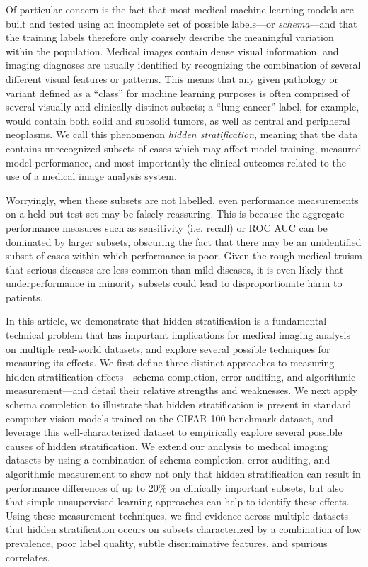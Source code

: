 \documentclass[sigconf]{acmart}
\begin{document}
Of particular concern is the fact that most medical machine learning models are built and tested using an incomplete set of possible labels---or \textit{schema}---and that the training labels therefore only coarsely describe the meaningful variation within the population. 
Medical images contain dense visual information, and imaging diagnoses are usually identified by recognizing the combination of several different visual features or patterns. 
This means that any given pathology or variant defined as a ``class'' for machine learning purposes is often comprised of several visually and clinically distinct subsets; a ``lung cancer'' label, for example, would contain both solid and subsolid tumors, as well as central and peripheral neoplasms. 
We call this phenomenon \textit{hidden stratification}, meaning that the data contains unrecognized subsets of cases which may affect model training, measured model performance, and most importantly the clinical outcomes related to the use of a medical image analysis system.  

Worryingly, when these subsets are not labelled, even performance measurements on a held-out test set may be falsely reassuring. 
This is because the aggregate performance measures such as sensitivity (i.e. recall) or ROC AUC can be dominated by larger subsets, obscuring the fact that there may be an unidentified subset of cases within which performance is poor. 
Given the rough medical truism that serious diseases are less common than mild diseases, it is even likely that underperformance in minority subsets could lead to disproportionate harm to patients.

In this article, we demonstrate that hidden stratification is a fundamental technical problem that has important implications for medical imaging analysis on multiple real-world datasets, and explore several possible techniques for measuring its effects. 
We first define three distinct approaches to measuring hidden stratification effects---schema completion, error auditing, and algorithmic measurement---and detail their relative strengths and weaknesses.
We next apply schema completion to illustrate that hidden stratification is present in standard computer vision models trained on the CIFAR-100 benchmark dataset, and leverage this well-characterized dataset to empirically explore several possible causes of hidden stratification.
We extend our analysis to medical imaging datasets by using a combination of schema completion, error auditing, and algorithmic measurement to show not only that hidden stratification can result in performance differences of up to 20\% on clinically important subsets, but also that simple unsupervised learning approaches can help to identify these effects.  
Using these measurement techniques, we find evidence across multiple datasets that hidden stratification occurs on subsets characterized by a combination of low prevalence, poor label quality, subtle discriminative features, and spurious correlates. 
\end{document}
